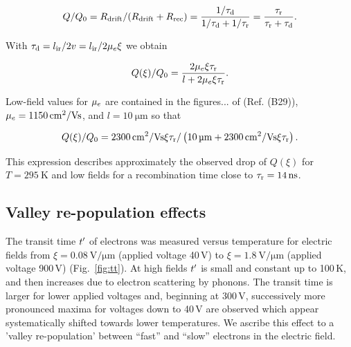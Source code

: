 \begin{equation}
 Q / Q_0 = R_{\textrm{drift}} / (R_{\textrm{drift}} + R_\textrm{rec}) = \frac{1/\tau_{\textrm{d}}}{1/\tau_{\textrm{d}} + 1/\tau_\textrm{r}} = \frac{\tau_\textrm{r}}{\tau_\textrm{r} + \tau_{\textrm{d}}}.
\end{equation}

\noindent
With $\tau_{\textrm{d}} = l_{\textrm{ir}}/2v = l_{\textrm{ir}}/2\mu_{\mathnormal{e}}\xi$ we obtain

\begin{equation}
 Q(\xi) / Q_0 = \frac{2\mu_{\mathnormal{e}} \xi \tau_\textrm{r}}{l + 2\mu_{\mathnormal{e}}\xi\tau_\textrm{r}}.
\end{equation}

\noindent
Low-field values for $\mu_{\mathnormal{e}}$ are contained in the figures...  of (Ref. {\color{red}(B29)}), $\mu_\e = \SI{1150}{\cm^2/\volt\s}$, and $l = \SI{10}{\um}$ so that 

\begin{equation}
 Q(\xi) / Q_0 = \SI{2300}{\cm^2/\volt\s} \xi \taurec / \left( \SI{10}{\um} + \SI{2300}{\cm^2/\volt\s} \xi \taurec \right).
\end{equation}

\noindent
This expression describes approximately the observed drop of $Q(\xi)$ for $T = \SI{295}{\kelvin}$ and low fields for a recombination time close to $\taurec = \SI{14}{\ns}$.



\subsection{Valley re-population effects}

The transit time $\mathnormal{t'}$ of electrons was measured versus temperature for electric fields from
 $\xi = \SI{0.08}{\volt/\um}$ (applied voltage 40\,V) to $\xi = \SI{1.8}{\volt/\um}$ (applied voltage 900\,V) (Fig.~\ref{fig:tt}). 
At high fields $\mathnormal{t'}$ is small and constant up to 100\,K, and then increases due to electron scattering by phonons. 
The transit time is larger for lower applied voltages and, beginning at 300\,V, successively more pronounced maxima for voltages down to 40\,V are observed
 which appear systematically shifted towards lower temperatures. 
We ascribe this effect to a 'valley re-population' between ``fast'' and ``slow'' electrons in the electric field. 

